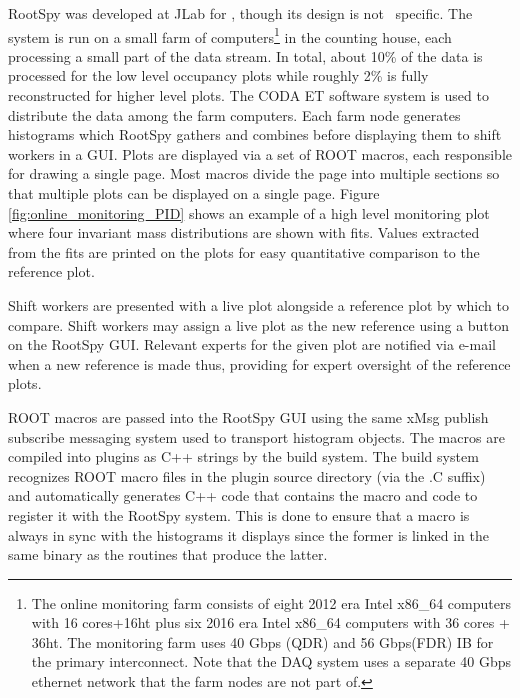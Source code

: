 RootSpy was developed at JLab for \GX, though its design is not \GX ~specific. The system is run on a small farm of computers\footnote{The online monitoring farm consists of eight 2012 era Intel x86\_64 computers with 16 cores+16ht plus six 2016 era Intel x86\_64 computers with 36 cores + 36ht. The monitoring farm uses 40 Gbps (QDR) and 56 Gbps(FDR) IB for the primary interconnect. Note that the DAQ system uses a separate 40 Gbps ethernet network that the farm nodes are not part of.} in the counting house, each processing a small part of the data stream. In total, about 10\% of the data is processed for the low level occupancy plots while roughly 2\% is fully reconstructed for higher level plots. The CODA ET software system is used to distribute the data among the farm computers. Each farm node generates histograms which RootSpy gathers and combines before displaying them to shift workers in a GUI.
Plots are displayed via a set of ROOT macros, each responsible for drawing a single page. Most macros divide the page into multiple sections so that multiple plots can be displayed on a single page. Figure \ref{fig:online_monitoring_PID} shows an example of a high level monitoring plot where four invariant mass distributions are shown with fits. Values extracted from the fits are printed on the plots for easy quantitative comparison to the reference plot. 

Shift workers are presented with a live plot alongside a reference plot by which to compare. Shift workers may assign a live plot as the new reference using a button on the RootSpy GUI. Relevant experts for the given plot are notified via e-mail when a new reference is made thus, providing for expert oversight of the reference plots.

ROOT macros are passed into the RootSpy GUI using the same xMsg\cite{xmsg} publish subscribe messaging system used to transport histogram objects. The macros are compiled into plugins as C++ strings by the build system. The build system recognizes ROOT macro files in the plugin source directory (via the .C suffix) and automatically generates C++ code that contains the macro and code to register it with the RootSpy system. This is done to ensure that a macro is always in sync with the histograms it displays since the former is linked in the same binary as the routines that produce the latter.

